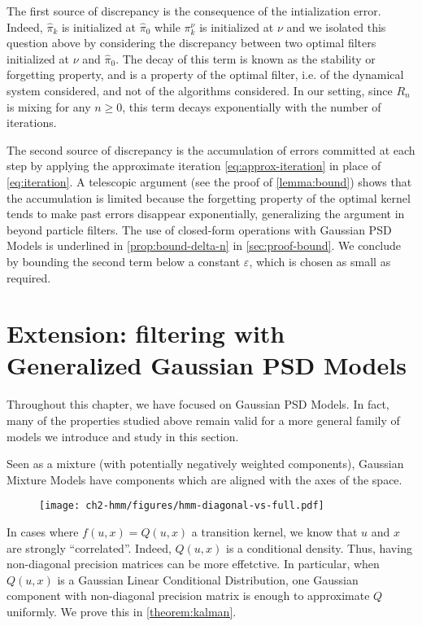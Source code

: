 The first source of discrepancy is the consequence of the intialization error. Indeed, $\hat\pi_k$ is initialized at $\hat \pi_0$ while $\pi_k^\nu$ is initialized at $\nu$ and we isolated this question above by considering the discrepancy between two optimal filters initialized at $\nu$ and $\hat \pi_0$. The decay of this term is known as the stability or forgetting property, and is a property of the optimal filter, i.e. of the dynamical system considered, and not of the algorithms considered. In our setting, since $R_n$ is mixing for any $n\geq 0$, this term decays exponentially with the number of iterations.

The second source of discrepancy is the accumulation of errors committed at each step by applying the approximate iteration \cref{eq:approx-iteration} in place of \cref{eq:iteration}. A telescopic argument (see the proof of \cref{lemma:bound}) shows that the accumulation is limited because the forgetting property of the optimal kernel tends to make past errors disappear exponentially, generalizing the argument in \cite{oudjane} beyond particle filters. The use of closed-form operations with Gaussian PSD Models is underlined in \cref{prop:bound-delta-n} in \cref{sec:proof-bound}. We conclude by bounding the second term below a constant $\varepsilon$, which is chosen as small as required.


\section{Extension: filtering with Generalized Gaussian PSD Models}\label{sec:generalized-psd-models}
Throughout this chapter, we have focused on Gaussian PSD Models. In fact, many of the properties studied above remain valid for a more general family of models we introduce and study in this section.

Seen as a mixture (with potentially negatively weighted components), Gaussian Mixture Models have components which are aligned with the axes of the space.
\begin{figure}[ht!]
\texttt{[image: ch2-hmm/figures/hmm-diagonal-vs-full.pdf]}
\end{figure}
In cases where $f(u, x) = Q(u, x)$ a transition kernel, we know that $u$ and $x$ are strongly ``correlated''. Indeed, $Q(u, x)$ is a conditional density. Thus, having non-diagonal precision matrices can be more effetctive. In particular, when $Q(u, x)$ is a Gaussian Linear Conditional Distribution, one Gaussian component with non-diagonal precision matrix is enough to approximate $Q$ uniformly. We prove this in \cref{theorem:kalman}.

